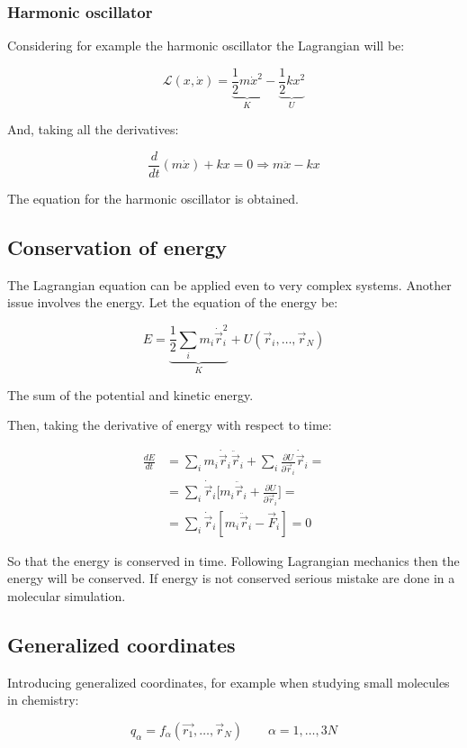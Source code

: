 		\subsubsection{Harmonic oscillator}
		Considering for example the harmonic oscillator the Lagrangian will be:

		$$\mathcal{L}(x, \dot{x}) = \underbrace{\frac{1}{2}m\dot{x}^2}_{K}-\underbrace{\frac{1}{2}kx^2}_{U}$$

		And, taking all the derivatives:

		$$\frac{d}{dt}(m\dot{x}) + kx = 0\Rightarrow m\ddot{x} - kx$$

		The equation for the harmonic oscillator is obtained.

	\subsection{Conservation of energy}
	The Lagrangian equation can be applied even to very complex systems.
	Another issue involves the energy.
	Let the equation of the energy be:

	$$E = \underbrace{\frac{1}{2}\sum\limits_{i}m_i\dot{\vec{r}}_i^2}_{K} + U(\vec{r}_i, \dots, \vec{r}_N)$$

	The sum of the potential and kinetic energy.

	Then, taking the derivative of energy with respect to time:

	\begin{align*}
		\frac{dE}{dt}&= \sum\limits_im_i\dot{\vec{r}}_i\ddot{\vec{r}}_i + \sum\limits_i\frac{\partial U}{\partial \vec{r}_i}\dot{\vec{r}}_i=\\
								 &=\sum\limits_i\dot{\vec{r}}_i\biggl[m_i\ddot{\vec{r}}_i+\frac{\partial U}{\partial\vec{r}_i}\biggr] = \\
								 &=\sum\limits_i\dot{\vec{r}}_i[m_i\ddot{\vec{r}}_i-\vec{F}_i] = 0
	\end{align*}

	So that the energy is conserved in time.
	Following Lagrangian mechanics then the energy will be conserved.
	If energy is not conserved serious mistake are done in a molecular simulation.

	\subsection{Generalized coordinates}
	Introducing generalized coordinates, for example when studying small molecules in chemistry:

	$$q_\alpha = f_\alpha(\vec{r_1}, \dots, \vec{r}_N)\qquad \alpha = 1, \dots, 3N$$

